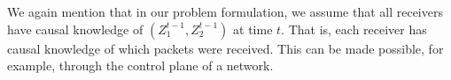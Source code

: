 %		
%		 	
%	


%
We again mention that in our problem formulation, we assume that all receivers have causal knowledge of $(Z_{1}^{t-1}, Z_{2}^{t-1})$ at time $t$.  That is, each receiver has causal knowledge of which packets were received.  This can be made possible, for example, through the control plane of a network.

